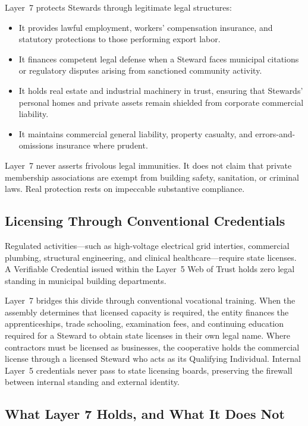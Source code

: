 Layer~7 protects Stewards through legitimate legal structures:
\begin{itemize}
  \item It provides lawful employment, workers' compensation insurance, and statutory protections to those performing export labor.
  \item It finances competent legal defense when a Steward faces municipal citations or regulatory disputes arising from sanctioned community activity.
  \item It holds real estate and industrial machinery in trust, ensuring that Stewards' personal homes and private assets remain shielded from corporate commercial liability.
  \item It maintains commercial general liability, property casualty, and errors-and-omissions insurance where prudent.
\end{itemize}
Layer~7 never asserts frivolous legal immunities. It does not claim that private membership associations are exempt from building safety, sanitation, or criminal laws. Real protection rests on impeccable substantive compliance.

\subsection{Licensing Through Conventional Credentials}

Regulated activities—such as high-voltage electrical grid interties, commercial plumbing, structural engineering, and clinical healthcare—require state licenses. A Verifiable Credential issued within the Layer~5 Web of Trust holds zero legal standing in municipal building departments.

Layer~7 bridges this divide through conventional vocational training. When the assembly determines that licensed capacity is required, the entity finances the apprenticeships, trade schooling, examination fees, and continuing education required for a Steward to obtain state licenses in their own legal name. Where contractors must be licensed as businesses, the cooperative holds the commercial license through a licensed Steward who acts as its Qualifying Individual. Internal Layer~5 credentials never pass to state licensing boards, preserving the firewall between internal standing and external identity.

\subsection{What Layer 7 Holds, and What It Does Not}
\label{sec:l7-records}

